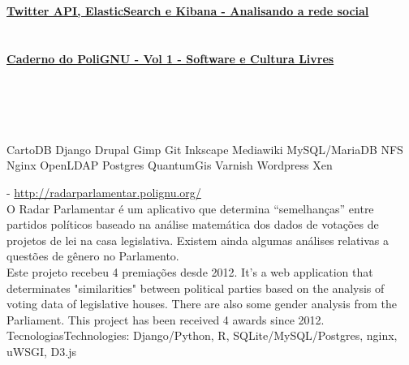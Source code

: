 \documentclass[]{friggeri-cv}
\begin{document}
{\href{http://polignu.org/artigo/twitter-api-elasticsearch-e-kibana-analisando-rede-social}{\textbf{Twitter API, ElasticSearch e Kibana - Analisando a rede social}}\\
\emph{}\\}\\
\href{http://polignu.org/administrativo/caderno-polignu-volume-1-software-e-culturas-livres}{\textbf{Caderno do PoliGNU - Vol 1 - Software e Cultura Livres}}\\
\emph{}\\

\newpage
{}%
\begin{aside}
~
~
~
  \section{}
    CartoDB
    Django
    Drupal
    Gimp
  	Git
    Inkscape
    Mediawiki
    MySQL/MariaDB
    NFS
    Nginx
    OpenLDAP
    Postgres
    QuantumGis
    Varnish
    Wordpress
    Xen
\end{aside}

\textbf{} - \href{http://radarparlamentar.polignu.org/}{http://radarparlamentar.polignu.org/}\\
%
{O Radar Parlamentar é um aplicativo que determina ``semelhanças'' entre partidos \nohyphens{políticos} baseado na análise matemática dos dados de votações de projetos de lei na casa \nohyphens{legislativa}. Existem ainda algumas análises relativas a questões de gênero no Parlamento.\\
Este projeto recebeu 4 premiações desde 2012.}%
{It's a web application that determinates "similarities" between political parties based on the analysis of voting data of legislative houses. There are also some gender analysis from the Parliament. 
This project has been received 4 awards since 2012.}\\
%
{Tecnologias}{Technologies}: Django/Python, R, SQLite/MySQL/Postgres, nginx, uWSGI, D3.js
\end{document}
